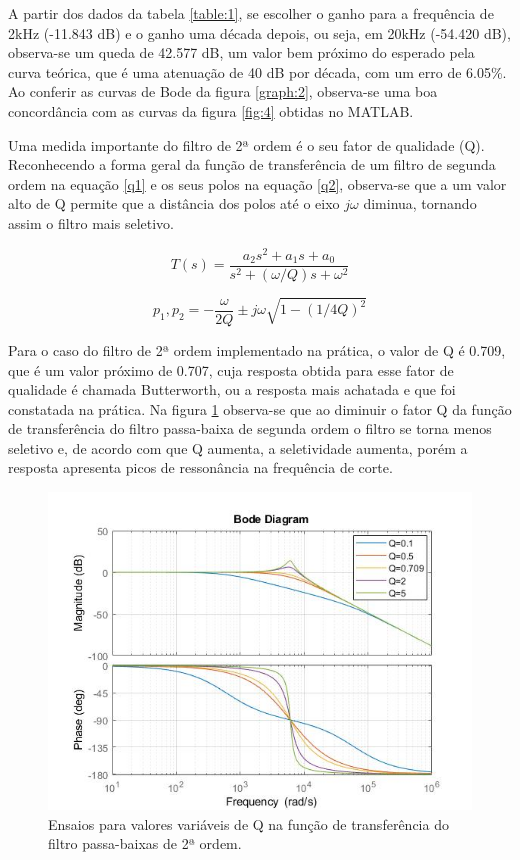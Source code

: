 A partir dos dados da tabela \ref{table:1}, se escolher o ganho para a frequência de 2kHz (-11.843 dB) e o ganho uma década depois, ou seja, em 20kHz (-54.420 dB), observa-se um queda de 42.577 dB, um valor bem próximo do esperado pela curva teórica, que é uma atenuação de 40 dB por década, com um erro de 6.05\%. Ao conferir as curvas de Bode da figura \ref{graph:2}, observa-se uma boa concordância com as curvas da figura \ref{fig:4} obtidas no MATLAB.

Uma medida importante do filtro de 2ª ordem é o seu fator de qualidade (Q). Reconhecendo a forma geral da função de transferência de um filtro de segunda ordem na equação \ref{q1} e os seus polos na equação \ref{q2}, observa-se que a um valor alto de Q permite que a distância dos polos até o eixo $j\omega$ diminua, tornando assim o filtro mais seletivo.

\begin{equation} \label{q1}
    T(s) = \frac{a_2s^2+a_1s+a_0}{s^2+(\omega/Q)s+\omega^2}
\end{equation}

\begin{equation} \label{q2}
    p_1, p_2 = -\frac{\omega}{2Q}\pm j\omega\sqrt{1-(1/4Q)^2}
\end{equation}

Para o caso do filtro de 2ª ordem implementado na prática, o valor de Q é 0.709, que é um valor próximo de 0.707, cuja resposta obtida para esse fator de qualidade é chamada Butterworth, ou a resposta mais achatada e que foi constatada na prática. Na figura \ref{Q} observa-se que ao diminuir o fator Q da função de transferência do filtro passa-baixa de segunda ordem o filtro se torna menos seletivo e, de acordo com que Q aumenta, a seletividade aumenta, porém a resposta apresenta picos de ressonância na frequência de corte. 

\begin{figure}[H] 
\centering
\includegraphics[width=14cm]{images/BodeQ.jpg}
\caption{Ensaios para valores variáveis de Q na função de transferência do filtro passa-baixas de 2ª ordem.}
\label{Q} 
\end{figure}

